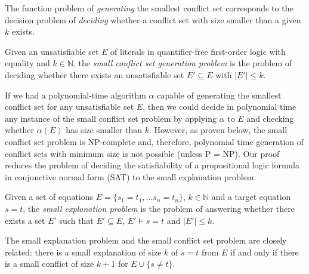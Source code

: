 \documentclass[smallextended]{svjour3}
\begin{document}


The function problem of \emph{generating} the smallest conflict set corresponds to 
the decision problem of \emph{deciding} whether a conflict set with 
size smaller than a given $k$ exists.

\begin{definition}
Given an unsatisfiable set $E$ of literals in quantifier-free first-order logic
with equality and $k \in \mathbb{N}$, the \emph{small conflict set generation
  problem} is the problem of deciding whether there exists an unsatisfiable set
$E' \subseteq E$ with $|E'| \leq k$.
\end{definition}

\noindent If we had a polynomial-time algorithm $\alpha$ capable of generating 
the smallest conflict set for any unsatisfiable set $E$, 
then we could decide in polynomial time any instance of the small conflict set 
problem by applying $\alpha$ to $E$ and checking whether $\alpha(E)$ has size smaller than $k$. 
However, as proven below, the small conflict set problem is NP-complete and, therefore, 
polynomial time generation of conflict sets with minimum size is not possible (unless P = NP).
%
Our proof reduces the problem
of deciding the satisfiability of a propositional logic formula in conjunctive
normal form (SAT) to the small explanation problem.
%
\begin{definition}
Given a set of equations $E = \{ s_1=t_1,\ldots s_n=t_n\}$, $k \in
\mathbb{N}$ and a target equation $s = t$, the \emph{small explanation problem}
is the problem of answering whether there exists a set $E'$ such that $E'
\subseteq E$, $E' \models s = t$ and $|E'| \leq k$.
\end{definition}

\noindent The small explanation problem and the small conflict set
problem are closely related: there is a small explanation of size $k$ of $s=t$
from $E$ if and only if there is a small conflict of size $k+1$ for $E \cup
\{s\neq t\}$.  
\end{document}
